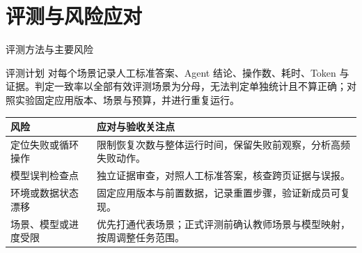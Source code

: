 \section{评测与风险应对}
\begin{frame}{评测方法与主要风险}
\small
\begin{block}{评测计划}
对每个场景记录人工标准答案、Agent 结论、操作数、耗时、Token 与证据。判定一致率以全部有效评测场景为分母，无法判定单独统计且不算正确；对照实验固定应用版本、场景与预算，并进行重复运行。
\end{block}
\begin{tabularx}{\textwidth}{lX}
\toprule
风险 & 应对与验收关注点 \\
\midrule
定位失败或循环操作 & 限制恢复次数与整体运行时间，保留失败前观察，分析高频失败动作。\\
模型误判检查点 & 独立证据审查，对照人工标准答案，核查跨页证据与误报。\\
环境或数据状态漂移 & 固定应用版本与前置数据，记录重置步骤，验证新成员可复现。\\
场景、模型或进度受限 & 优先打通代表场景；正式评测前确认教师场景与模型映射，按周调整任务范围。\\
\bottomrule
\end{tabularx}
\end{frame}

